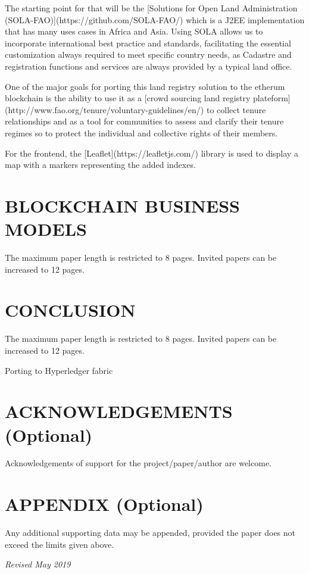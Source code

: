 \documentclass{isprs} %
\begin{document}
The starting point for that will be the [Solutions for Open Land Administration (SOLA-FAO)](https://github.com/SOLA-FAO/) which is a J2EE implementation that has many uses cases in Africa and Asia. Using SOLA allows us to incorporate international best practice and standards, facilitating the essential customization always required to meet specific country needs, as Cadastre and registration functions and services are always provided by a typical land office.

One of the major goals for porting this land registry solution to the etherum blockchain is the ability to use it as a [crowd sourcing land registry plateform](http://www.fao.org/tenure/voluntary-guidelines/en/) to collect tenure relationships and as a tool for communities to assess and clarify their tenure regimes so to protect the individual and collective rights of their members. 

For the frontend, the [Leaflet](https://leafletjs.com/) library is used to display a map with a markers representing the added indexes.



\section{BLOCKCHAIN BUSINESS MODELS}\label{sec:BLOCKCHAIN BUSINESS MODELS}


The maximum paper length is restricted to 8 pages. Invited papers can be increased to 12 pages. 


\section{CONCLUSION}\label{sec:CONCLUSION}

The maximum paper length is restricted to 8 pages. Invited papers can be increased to 12 pages. 

Porting to Hyperledger fabric 


\section*{ACKNOWLEDGEMENTS (Optional)}\label{ACKNOWLEDGEMENTS}
Acknowledgements of support for the project/paper/author are welcome. 

{
	\begin{spacing}{1.17}
		\normalsize
	\end{spacing}
}


\section*{APPENDIX (Optional)}\label{APPENDIX}

Any additional supporting data may be appended, provided the paper does not exceed the limits given above. 

\vspace{1cm}
\textit{Revised May 2019}
\end{document}
